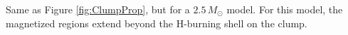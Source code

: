 \label{fig:ClumpPropMassive}
Same as Figure \ref{fig:ClumpProp}, but for a $2.5 \, M_\odot$ model. For this model, the magnetized regions extend beyond the H-burning shell on the clump.